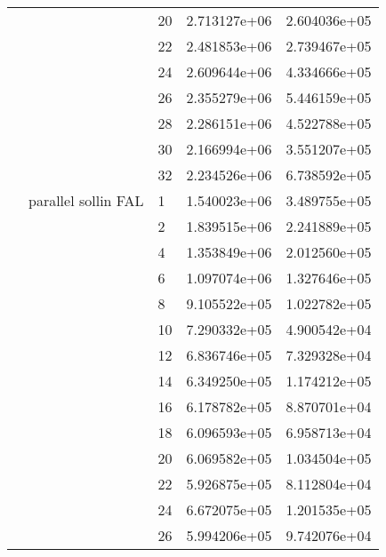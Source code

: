 \begin{tabular}{lllrr}
                      &                     & 20 &  2.713127e+06 &  2.604036e+05 \\
                      &                     & 22 &  2.481853e+06 &  2.739467e+05 \\
                      &                     & 24 &  2.609644e+06 &  4.334666e+05 \\
                      &                     & 26 &  2.355279e+06 &  5.446159e+05 \\
                      &                     & 28 &  2.286151e+06 &  4.522788e+05 \\
                      &                     & 30 &  2.166994e+06 &  3.551207e+05 \\
                      &                     & 32 &  2.234526e+06 &  6.738592e+05 \\
                      & parallel sollin FAL & 1  &  1.540023e+06 &  3.489755e+05 \\
                      &                     & 2  &  1.839515e+06 &  2.241889e+05 \\
                      &                     & 4  &  1.353849e+06 &  2.012560e+05 \\
                      &                     & 6  &  1.097074e+06 &  1.327646e+05 \\
                      &                     & 8  &  9.105522e+05 &  1.022782e+05 \\
                      &                     & 10 &  7.290332e+05 &  4.900542e+04 \\
                      &                     & 12 &  6.836746e+05 &  7.329328e+04 \\
                      &                     & 14 &  6.349250e+05 &  1.174212e+05 \\
                      &                     & 16 &  6.178782e+05 &  8.870701e+04 \\
                      &                     & 18 &  6.096593e+05 &  6.958713e+04 \\
                      &                     & 20 &  6.069582e+05 &  1.034504e+05 \\
                      &                     & 22 &  5.926875e+05 &  8.112804e+04 \\
                      &                     & 24 &  6.672075e+05 &  1.201535e+05 \\
                      &                     & 26 &  5.994206e+05 &  9.742076e+04 \\

\end{tabular}
